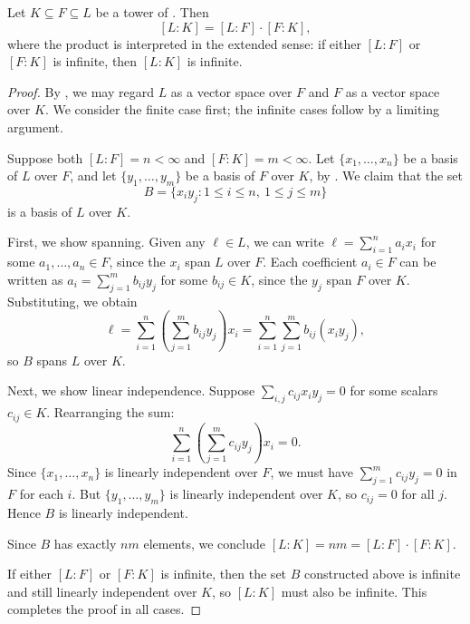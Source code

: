 \begin{lemma} \label{lemma:tower_law_for_degrees_of_field_extensions}
    Let $K \subseteq F \subseteq L$ be a tower of . Then
    $$[L:K] = [L:F] \cdot [F:K],$$
    where the product is interpreted in the extended sense: if either $[L:F]$ or $[F:K]$ is infinite, then $[L:K]$ is infinite.
\end{lemma}
\begin{proof}
    By , we may regard $L$ as a vector space over $F$ and $F$ as a vector space over $K$. We consider the finite case first; the infinite cases follow by a limiting argument.

    Suppose both $[L:F] = n < \infty$ and $[F:K] = m < \infty$. Let $\{x_1, \dots, x_n\}$ be a basis of $L$ over $F$, and let $\{y_1, \dots, y_m\}$ be a basis of $F$ over $K$, by . We claim that the set
    $$B = \{x_i y_j : 1 \leq i \leq n,\ 1 \leq j \leq m\}$$
    is a basis of $L$ over $K$.

    First, we show spanning. Given any $\ell \in L$, we can write $\ell = \sum_{i=1}^n a_i x_i$ for some $a_1, \dots, a_n \in F$, since the $x_i$ span $L$ over $F$. Each coefficient $a_i \in F$ can be written as $a_i = \sum_{j=1}^m b_{ij} y_j$ for some $b_{ij} \in K$, since the $y_j$ span $F$ over $K$. Substituting, we obtain
    $$\ell = \sum_{i=1}^n \left(\sum_{j=1}^m b_{ij} y_j\right) x_i = \sum_{i=1}^n \sum_{j=1}^m b_{ij} (x_i y_j),$$
    so $B$ spans $L$ over $K$.

    Next, we show linear independence. Suppose $\sum_{i,j} c_{ij} x_i y_j = 0$ for some scalars $c_{ij} \in K$. Rearranging the sum:
    $$\sum_{i=1}^n \left(\sum_{j=1}^m c_{ij} y_j\right) x_i = 0.$$
    Since $\{x_1, \dots, x_n\}$ is linearly independent over $F$, we must have $\sum_{j=1}^m c_{ij} y_j = 0$ in $F$ for each $i$. But $\{y_1, \dots, y_m\}$ is linearly independent over $K$, so $c_{ij} = 0$ for all $j$. Hence $B$ is linearly independent.

    Since $B$ has exactly $nm$ elements, we conclude $[L:K] = nm = [L:F] \cdot [F:K]$.

    If either $[L:F]$ or $[F:K]$ is infinite, then the set $B$ constructed above is infinite and still linearly independent over $K$, so $[L:K]$ must also be infinite. This completes the proof in all cases.
\end{proof}
